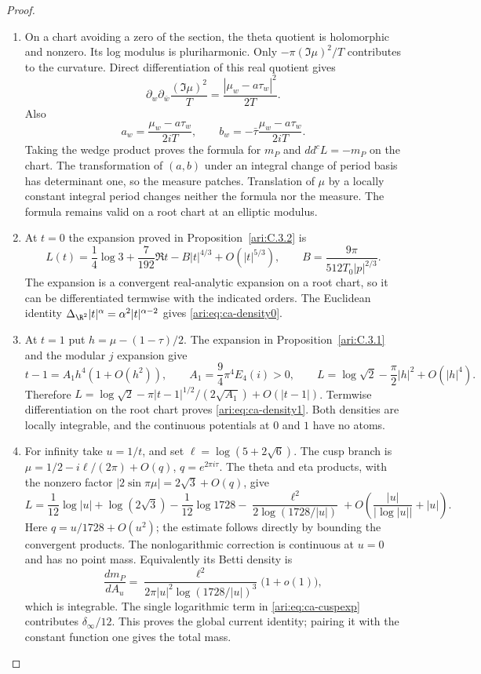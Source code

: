 \begin{proof}
\begin{enumerate}[label=\arabic*.,leftmargin=*]
\item On a chart avoiding a zero of the section, the theta quotient
is holomorphic and nonzero. Its log modulus is pluriharmonic.
Only $-\pi(\Im\mu)^2/T$ contributes to the curvature.
Direct differentiation of this real quotient gives
\[
 \partial_w\partial_{\bar w}\frac{(\Im\mu)^2}{T}
       =\frac{|\mu_w-a\tau_w|^2}{2T}.
\]
Also
\[
 a_w=\frac{\mu_w-a\tau_w}{2iT},\qquad
 b_w=-\bar\tau\frac{\mu_w-a\tau_w}{2iT}.
\]
Taking the wedge product proves the formula for $m_P$ and
$dd^cL=-m_P$ on the chart. The transformation of $(a,b)$
under an integral change of period basis has determinant one,
so the measure patches. Translation of $\mu$ by a locally
constant integral period changes neither the formula nor
the measure. The formula remains valid on a root chart
at an elliptic modulus.

\item At $t=0$ the expansion proved in Proposition~\ref{ari:C.3.2} is
\[
 L(t)=\frac14\log3+\frac7{192}\Re t
       -B|t|^{4/3}+O(|t|^{5/3}),\qquad
 B=\frac{9\pi}{512T_0|p|^{2/3}}.
\]
The expansion is a convergent real-analytic expansion on a
root chart, so it can be differentiated termwise with the
indicated orders. The Euclidean identity
$\Delta_{\R^2}|t|^\alpha=\alpha^2|t|^{\alpha-2}$ gives
\eqref{ari:eq:ca-density0}.

\item At $t=1$ put $h=\mu-(1-\tau)/2$. The expansion in Proposition~\ref{ari:C.3.1}
and the modular $j$ expansion give
\[
 t-1=A_1h^4(1+O(h^2)),\qquad
 A_1=\frac94\pi^4E_4(i)>0,\qquad
 L=\log\sqrt2-\frac\pi2|h|^2+O(|h|^4).
\]
Therefore
$L=\log\sqrt2-\pi|t-1|^{1/2}/(2\sqrt{A_1})+O(|t-1|)$.
Termwise differentiation on the root chart proves
\eqref{ari:eq:ca-density1}. Both densities are locally integrable,
and the continuous potentials at $0$ and $1$ have no atoms.

\item For infinity take $u=1/t$, and set $\ell=\log(5+2\sqrt6)$.
The cusp branch is
$\mu=1/2-i\ell/(2\pi)+O(q)$, $q=e^{2\pi i\tau}$.
The theta and eta products, with the nonzero factor
$|2\sin\pi\mu|=2\sqrt3+O(q)$, give
\begin{equation}\label{ari:eq:ca-cuspexp}
 L=\frac1{12}\log|u|+\log(2\sqrt3)-\frac1{12}\log1728
          -\frac{\ell^2}{2\log(1728/|u|)}
          +O\left(\frac{|u|}{|\log|u||}+|u|\right).
\end{equation}
Here $q=u/1728+O(u^2)$; the estimate follows directly by
bounding the convergent products. The nonlogarithmic
correction is continuous at $u=0$ and has no point mass.
Equivalently its Betti density is
\[
 \frac{dm_P}{dA_u}
  =\frac{\ell^2}{2\pi|u|^2\log(1728/|u|)^3}
       \bigl(1+o(1)\bigr),
\]
which is integrable. The single logarithmic term in
\eqref{ari:eq:ca-cuspexp} contributes $\delta_\infty/12$.
This proves the global current identity; pairing it with
the constant function one gives the total mass.
\end{enumerate}
\end{proof}

